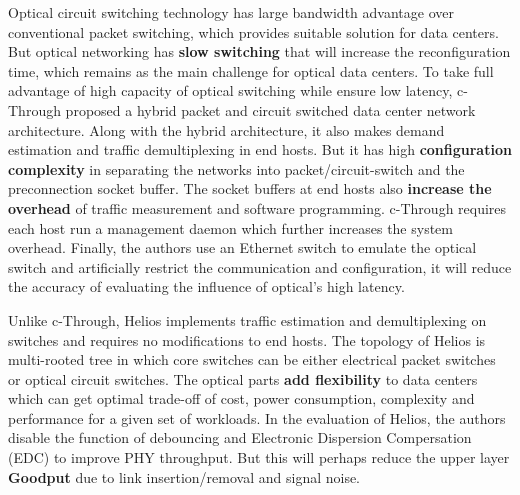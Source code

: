 \documentclass[journal,onecolumn,11pt]{IEEEtran}
\begin{document}
Optical circuit switching technology has large bandwidth advantage over conventional packet switching, which provides suitable solution for data centers. But optical networking has \textbf{slow switching} that will increase the reconfiguration time, which remains as the main challenge for optical data centers. To take full advantage of high capacity of optical switching while ensure low latency, c-Through proposed a hybrid packet and circuit switched data center network architecture. Along with the hybrid architecture, it also makes demand estimation and traffic demultiplexing in end hosts. But it has high \textbf{configuration complexity} in separating the networks into packet/circuit-switch and the preconnection socket buffer. The socket buffers at end hosts also \textbf{increase the overhead} of traffic measurement and software programming. c-Through requires each host run a management daemon which further increases the system overhead. Finally, the authors use an Ethernet switch to emulate the optical switch and artificially restrict the communication and configuration, it will reduce the accuracy of evaluating the influence of optical's high latency.


Unlike c-Through, Helios implements traffic estimation and demultiplexing on switches and requires no modifications to end hosts. The topology of Helios is multi-rooted tree in which core switches can be either electrical packet switches or optical circuit switches. The optical parts \textbf{add flexibility} to data centers which can get optimal trade-off of cost, power consumption, complexity and performance for a given set of workloads. In the evaluation of Helios, the authors disable the function of debouncing and Electronic Dispersion Compersation (EDC) to improve PHY throughput. But this will perhaps reduce the upper layer \textbf{Goodput} due to link insertion/removal and signal noise.
\end{document}
